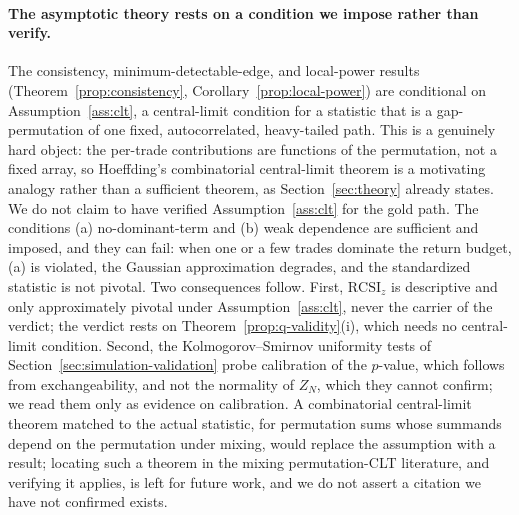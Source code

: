 \documentclass[risks,article,submit,pdftex,oneauthor]{Definitions/mdpi}
\begin{document}
\paragraph{The asymptotic theory rests on a condition we impose rather than verify.}
The consistency, minimum-detectable-edge, and local-power results
(Theorem~\ref{prop:consistency}, Corollary~\ref{prop:local-power}) are
conditional on Assumption~\ref{ass:clt}, a central-limit condition for a statistic
that is a gap-permutation of one fixed, autocorrelated, heavy-tailed path. This is a
genuinely hard object: the per-trade contributions are functions of the permutation,
not a fixed array, so Hoeffding's combinatorial central-limit theorem is a motivating
analogy rather than a sufficient theorem, as Section~\ref{sec:theory} already states.
We do not claim to have verified Assumption~\ref{ass:clt} for the gold path. The
conditions (a) no-dominant-term and (b) weak dependence are sufficient and imposed,
and they can fail: when one or a few trades dominate the return budget, (a) is
violated, the Gaussian approximation degrades, and the standardized statistic is not
pivotal. Two consequences follow. First, $\mathrm{RCSI}_z$ is descriptive and only
approximately pivotal under Assumption~\ref{ass:clt}, never the carrier of the
verdict; the verdict rests on Theorem~\ref{prop:q-validity}(i), which needs no
central-limit condition. Second, the Kolmogorov--Smirnov uniformity tests of
Section~\ref{sec:simulation-validation} probe calibration of the $p$-value, which
follows from exchangeability, and not the normality of $Z_N$, which they cannot
confirm; we read them only as evidence on calibration. A combinatorial central-limit
theorem matched to the actual statistic, for permutation sums whose summands depend on
the permutation under mixing, would replace the assumption with a result; locating
such a theorem in the mixing permutation-CLT literature, and verifying it applies, is
left for future work, and we do not assert a citation we have not confirmed exists.
\end{document}
